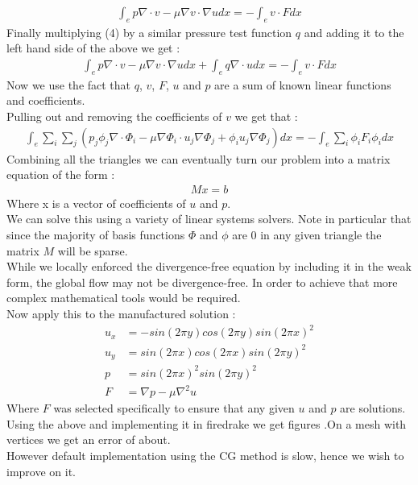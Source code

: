 \documentclass[11pt,twoside,a4paper]{article}
\begin{document}
\begin{align*}
\int_{e} p \nabla \cdot v - \mu \nabla v \cdot \nabla u dx = -\int_{e} v \cdot F dx
\end{align*}
Finally multiplying (4) by a similar pressure test function $q$ and adding it to the left hand side of the above we get :
\begin{align}
\int_{e} p \nabla \cdot v - \mu \nabla v \cdot \nabla u dx + \int_{e} q \nabla \cdot u dx = -\int_{e} v \cdot F dx
\end{align}
Now we use the fact that $q$, $v$, $F$, $u$ and $p$ are a sum of known linear functions and coefficients.\\
Pulling out and removing the coefficients of $v$ we get that :
\begin{align*}
 \int_{e} \sum_i \sum_j (  p_j \phi_j \nabla  \cdot \Phi_i - \mu \nabla \Phi_i \cdot u_j \nabla \Phi_j +   \phi_i u_j \nabla \Phi_j) dx = -\int_{e} \sum_i \phi_i F_i \phi_i dx
\end{align*}
Combining all the triangles we can eventually turn our problem into a matrix equation of the form :
\begin{align}
M x = b
\end{align}
Where x is a vector of coefficients of $u$ and $p$.\\
We can solve this using a variety of linear systems solvers. Note in particular that since the majority of basis functions $\Phi$ and $\phi$ are $0$ in any given triangle the matrix $M$ will be sparse.\\
While we locally enforced the divergence-free equation by including it in the weak form, the global flow may not be divergence-free. In order to achieve that more complex mathematical tools would be required.\\
Now apply this to the manufactured solution :
\begin{align*}
u_x &=  -sin(2 \pi y) cos(2 \pi y)  sin(2 \pi x)^2 \\
u_y &= sin(2 \pi x) cos(2 \pi x)  sin(2 \pi y)^2 \\
p &= sin(2 \pi x)^2 sin(2 \pi y)^2 \\
F &= \nabla p - \mu \nabla^2 u
\end{align*}
Where $F$ was selected specifically to ensure that any given $u$ and $p$ are solutions.
Using the above and implementing it in firedrake we get figures .On a mesh with vertices we get an error of about.\\
However default implementation using the CG method is slow, hence we wish to improve on it.
\end{document}
